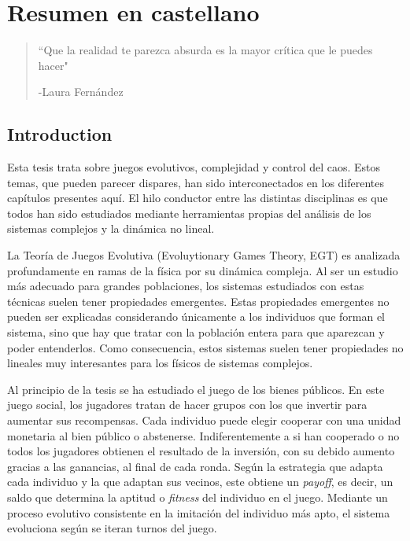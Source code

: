 \chapter{Resumen en castellano}



\begin{quotation}
	\vspace{-3cm}
    \begin{flushright}
    \begin{minipage}[t][5cm][b]{0.5\textwidth}
    { ``Que la realidad te parezca absurda es la mayor crítica que le puedes hacer"}
    
    \bigskip
    
    -{\small  Laura Fernández}
    \end{minipage}
    \end{flushright}
    
    \vspace{0.5cm}
\end{quotation}




\section{Introduction}

Esta tesis trata sobre juegos evolutivos, complejidad y control del caos. Estos temas, que pueden parecer dispares, han sido interconectados en los diferentes capítulos presentes aquí. El hilo conductor entre las distintas disciplinas es que todos han sido estudiados mediante herramientas propias del análisis de los sistemas complejos y la dinámica no lineal. 

La Teoría de Juegos Evolutiva (Evoluytionary Games Theory, EGT) es analizada profundamente en ramas de la física por su dinámica compleja. Al ser un estudio más adecuado para grandes poblaciones, los sistemas estudiados con estas técnicas suelen tener propiedades emergentes. Estas propiedades emergentes no pueden ser explicadas considerando únicamente a los individuos que forman el sistema, sino que hay que tratar con la población entera para que aparezcan y poder entenderlos. Como consecuencia, estos sistemas suelen tener propiedades no lineales muy interesantes para los físicos de sistemas complejos.

Al principio de la tesis se ha estudiado el juego de los bienes públicos. En este juego social, los jugadores tratan de hacer grupos con los que invertir para aumentar sus recompensas. Cada individuo puede elegir cooperar con una unidad monetaria al bien público o abstenerse. Indiferentemente a si han cooperado o no todos los jugadores obtienen el resultado de la inversión, con su debido aumento gracias a las ganancias, al final de cada ronda. Según la estrategia que adapta cada individuo y la que adaptan sus vecinos, este obtiene un \textit{payoff}, es decir, un saldo que determina la aptitud o \textit{fitness} del individuo en el juego. Mediante un proceso evolutivo consistente en la imitación del individuo más apto, el sistema evoluciona según se iteran turnos del juego.

